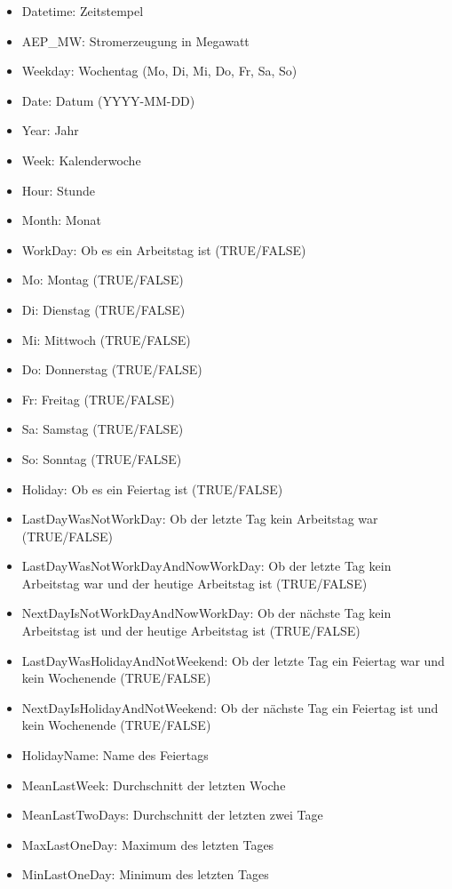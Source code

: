 \documentclass[11pt,ngerman,a4paper,]{article}
\providecommand{\tightlist}{%
  \setlength{\itemsep}{0pt}\setlength{\parskip}{0pt}}
\begin{document}
\begin{itemize}
\tightlist
\item
  Datetime: Zeitstempel
\item
  AEP\_MW: Stromerzeugung in Megawatt
\item
  Weekday: Wochentag (Mo, Di, Mi, Do, Fr, Sa, So)
\item
  Date: Datum (YYYY-MM-DD)
\item
  Year: Jahr
\item
  Week: Kalenderwoche
\item
  Hour: Stunde
\item
  Month: Monat
\item
  WorkDay: Ob es ein Arbeitstag ist (TRUE/FALSE)
\item
  Mo: Montag (TRUE/FALSE)
\item
  Di: Dienstag (TRUE/FALSE)
\item
  Mi: Mittwoch (TRUE/FALSE)
\item
  Do: Donnerstag (TRUE/FALSE)
\item
  Fr: Freitag (TRUE/FALSE)
\item
  Sa: Samstag (TRUE/FALSE)
\item
  So: Sonntag (TRUE/FALSE)
\item
  Holiday: Ob es ein Feiertag ist (TRUE/FALSE)
\item
  LastDayWasNotWorkDay: Ob der letzte Tag kein Arbeitstag war (TRUE/FALSE)
\item
  LastDayWasNotWorkDayAndNowWorkDay: Ob der letzte Tag kein Arbeitstag war und der heutige Arbeitstag ist (TRUE/FALSE)
\item
  NextDayIsNotWorkDayAndNowWorkDay: Ob der nächste Tag kein Arbeitstag ist und der heutige Arbeitstag ist (TRUE/FALSE)
\item
  LastDayWasHolidayAndNotWeekend: Ob der letzte Tag ein Feiertag war und kein Wochenende (TRUE/FALSE)
\item
  NextDayIsHolidayAndNotWeekend: Ob der nächste Tag ein Feiertag ist und kein Wochenende (TRUE/FALSE)
\item
  HolidayName: Name des Feiertags
\item
  MeanLastWeek: Durchschnitt der letzten Woche
\item
  MeanLastTwoDays: Durchschnitt der letzten zwei Tage
\item
  MaxLastOneDay: Maximum des letzten Tages
\item
  MinLastOneDay: Minimum des letzten Tages
\end{itemize}
\end{document}
